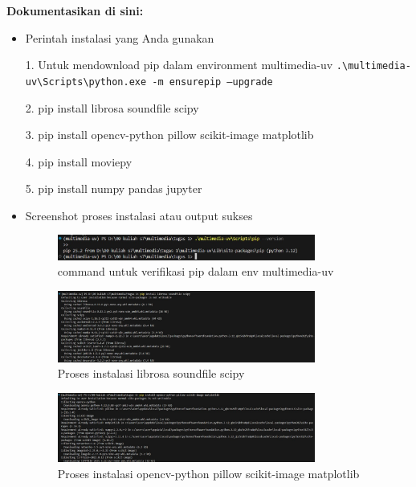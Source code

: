 \documentclass[11pt,a4paper]{article}
\begin{document}
\textbf{Dokumentasikan di sini:}
\begin{itemize}
    \item Perintah instalasi yang Anda gunakan
    \par 1. Untuk mendownload pip dalam environment multimedia-uv \texttt{.\textbackslash multimedia-uv\textbackslash Scripts\textbackslash python.exe -m ensurepip --upgrade}
    \par 2. pip install librosa soundfile scipy
    \par 3. pip install opencv-python pillow scikit-image matplotlib
    \par 4. pip install moviepy
    \par 5. pip install numpy pandas jupyter

    \item Screenshot proses instalasi atau output sukses
    \begin{figure}[h!]
        \centering
        \includegraphics[width=0.8\textwidth]{figure/sspip.jpg}
        \caption{command untuk verifikasi pip dalam env multimedia-uv}
    \end{figure}

    \begin{figure}[h!]
        \centering
        \includegraphics[width=0.8\textwidth]{figure/ss2soundfile.jpg}
        \caption{Proses instalasi librosa soundfile scipy}
    \end{figure}

    \begin{figure}[h!]
        \centering
        \includegraphics[width=0.8\textwidth]{figure/ss3image.jpg}
        \caption{Proses instalasi opencv-python pillow scikit-image matplotlib}
    \end{figure}


\end{itemize}
\end{document}
